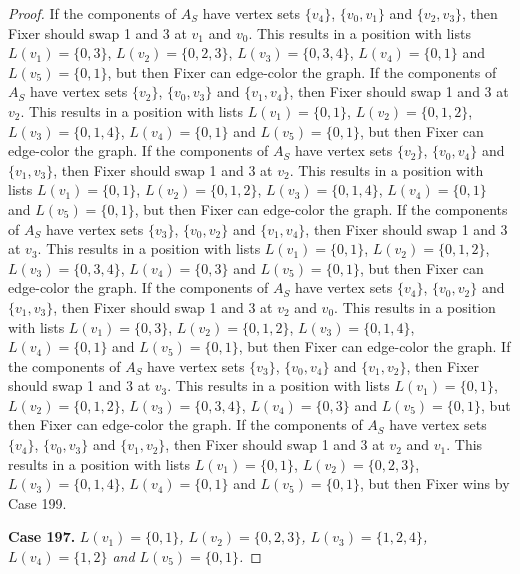 \documentclass[12pt]{amsart}
\theoremstyle{plain}
\theoremstyle{definition}
\theoremstyle{remark}
\begin{document}
\begin{proof}
If the components of $A_S$ have vertex sets $\{v_4\}$, $\{v_0, v_1\}$ and $\{v_2, v_3\}$, then Fixer should swap 1 and 3 at $v_1$ and $v_0$. This results in a position with lists $L(v_1) = \{0, 3\}$, $L(v_2) = \{0, 2, 3\}$, $L(v_3) = \{0, 3, 4\}$, $L(v_4) = \{0, 1\}$ and $L(v_5) = \{0, 1\}$, but then Fixer can edge-color the graph.
If the components of $A_S$ have vertex sets $\{v_2\}$, $\{v_0, v_3\}$ and $\{v_1, v_4\}$, then Fixer should swap 1 and 3 at $v_2$. This results in a position with lists $L(v_1) = \{0, 1\}$, $L(v_2) = \{0, 1, 2\}$, $L(v_3) = \{0, 1, 4\}$, $L(v_4) = \{0, 1\}$ and $L(v_5) = \{0, 1\}$, but then Fixer can edge-color the graph.
If the components of $A_S$ have vertex sets $\{v_2\}$, $\{v_0, v_4\}$ and $\{v_1, v_3\}$, then Fixer should swap 1 and 3 at $v_2$. This results in a position with lists $L(v_1) = \{0, 1\}$, $L(v_2) = \{0, 1, 2\}$, $L(v_3) = \{0, 1, 4\}$, $L(v_4) = \{0, 1\}$ and $L(v_5) = \{0, 1\}$, but then Fixer can edge-color the graph.
If the components of $A_S$ have vertex sets $\{v_3\}$, $\{v_0, v_2\}$ and $\{v_1, v_4\}$, then Fixer should swap 1 and 3 at $v_3$. This results in a position with lists $L(v_1) = \{0, 1\}$, $L(v_2) = \{0, 1, 2\}$, $L(v_3) = \{0, 3, 4\}$, $L(v_4) = \{0, 3\}$ and $L(v_5) = \{0, 1\}$, but then Fixer can edge-color the graph.
If the components of $A_S$ have vertex sets $\{v_4\}$, $\{v_0, v_2\}$ and $\{v_1, v_3\}$, then Fixer should swap 1 and 3 at $v_2$ and $v_0$. This results in a position with lists $L(v_1) = \{0, 3\}$, $L(v_2) = \{0, 1, 2\}$, $L(v_3) = \{0, 1, 4\}$, $L(v_4) = \{0, 1\}$ and $L(v_5) = \{0, 1\}$, but then Fixer can edge-color the graph.
If the components of $A_S$ have vertex sets $\{v_3\}$, $\{v_0, v_4\}$ and $\{v_1, v_2\}$, then Fixer should swap 1 and 3 at $v_3$. This results in a position with lists $L(v_1) = \{0, 1\}$, $L(v_2) = \{0, 1, 2\}$, $L(v_3) = \{0, 3, 4\}$, $L(v_4) = \{0, 3\}$ and $L(v_5) = \{0, 1\}$, but then Fixer can edge-color the graph.
If the components of $A_S$ have vertex sets $\{v_4\}$, $\{v_0, v_3\}$ and $\{v_1, v_2\}$, then Fixer should swap 1 and 3 at $v_2$ and $v_1$. This results in a position with lists $L(v_1) = \{0, 1\}$, $L(v_2) = \{0, 2, 3\}$, $L(v_3) = \{0, 1, 4\}$, $L(v_4) = \{0, 1\}$ and $L(v_5) = \{0, 1\}$, but then Fixer wins by Case 199.

\noindent\textbf{Case 197.  }\textit{$L(v_1) = \{0, 1\}$, $L(v_2) = \{0, 2, 3\}$, $L(v_3) = \{1, 2, 4\}$, $L(v_4) = \{1, 2\}$ and $L(v_5) = \{0, 1\}$.}


\end{proof}
\end{document}
